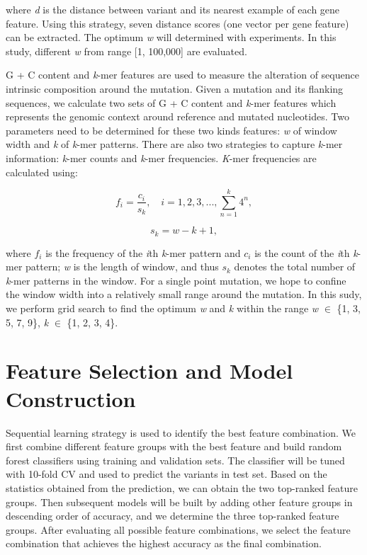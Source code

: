 \documentclass[a4paper,nohyper,nobib,openany,justified]{tufte-book}
\begin{document}
\begin{fullwidth}
\noindent where \emph{d} is the distance between variant and its nearest example of each gene feature. Using this strategy, seven distance scores (one vector per gene feature) can be extracted. The optimum \emph{w} will determined with experiments. In this study, different \emph{w} from range [1, 100,000] are evaluated.

G + C content and \emph{k}-mer features are used to measure the alteration of sequence intrinsic composition around the mutation. Given a mutation and its flanking sequences, we calculate two sets of G + C content and \emph{k}-mer features which represents the genomic context around reference and mutated nucleotides. Two parameters need to be determined for these two kinds features: \emph{w} of window width and \emph{k} of \emph{k}-mer patterns. There are also two strategies to capture \emph{k}-mer information: \emph{k}-mer counts and \emph{k}-mer frequencies. \emph{K}-mer frequencies are calculated using:

\begin{equation}
    f_i = \frac{c_i}{s_k}, \quad i = 1, 2, 3, ..., \sum_{n = 1}^{k}{4^n},
     \nonumber
\end{equation}

\begin{equation}
    s_k = w - k + 1,
     \nonumber
\end{equation}

\noindent where $f_i$ is the frequency of the \emph{i}th \emph{k}-mer pattern and $c_i$ is the count of the \emph{i}th \emph{k}-mer pattern; \emph{w} is the length of window, and thus $s_k$ denotes the total number of \emph{k}-mer patterns in the window. For a single point mutation, we hope to confine the window width into a relatively small range around the mutation. In this sudy, we perform grid search to find the optimum \emph{w} and \emph{k} within the range \emph{w} $\in$ \{1, 3, 5, 7, 9\}, \emph{k} $\in$ \{1, 2, 3, 4\}.

\chapter{Feature Selection and Model Construction}

Sequential learning strategy is used to identify the best feature combination. We first combine different feature groups with the best feature and build random forest classifiers using training and validation sets. The classifier will be tuned with 10-fold CV and used to predict the variants in test set. Based on the statistics obtained from the prediction, we can obtain the two top-ranked feature groups. Then subsequent models will be built by adding other feature groups in descending order of accuracy, and we determine the three top-ranked feature groups. After evaluating all possible feature combinations, we select the feature combination that achieves the highest accuracy as the final combination.


\end{fullwidth}
\end{document}
